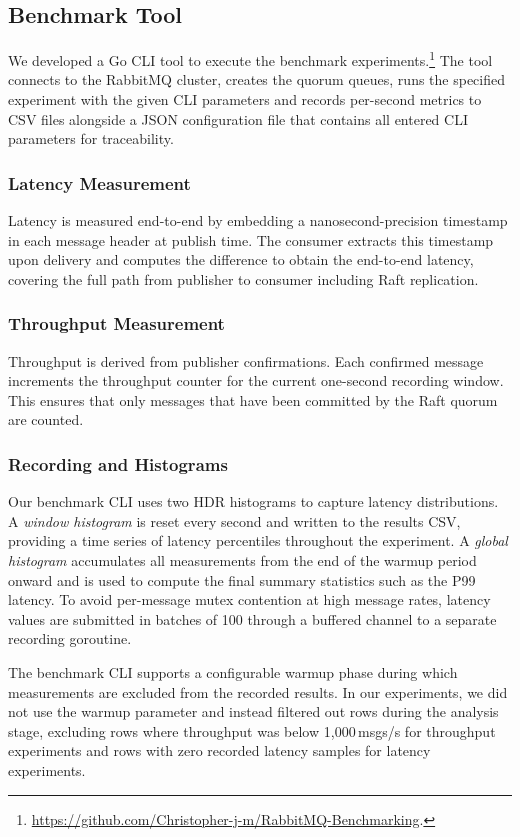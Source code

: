 \subsection{Benchmark Tool}
We developed a Go CLI tool to execute the benchmark experiments.\footnote{\url{https://github.com/Christopher-j-m/RabbitMQ-Benchmarking}.} The tool connects to the RabbitMQ cluster, creates the quorum queues, runs the specified experiment with the given CLI parameters and records per-second metrics to CSV files alongside a JSON configuration file that contains all entered CLI parameters for traceability.

\subsubsection{Latency Measurement}
Latency is measured end-to-end by embedding a nanosecond-precision timestamp in each message header at publish time. The consumer extracts this timestamp upon delivery and computes the difference to obtain the end-to-end latency, covering the full path from publisher to consumer including Raft replication.

\subsubsection{Throughput Measurement}
Throughput is derived from publisher confirmations. Each confirmed message increments the throughput counter for the current one-second recording window. This ensures that only messages that have been committed by the Raft quorum are counted.

\subsubsection{Recording and Histograms}
Our benchmark CLI uses two HDR histograms to capture latency distributions. A \textit{window histogram} is reset every second and written to the results CSV, providing a time series of latency percentiles throughout the experiment. A \textit{global histogram} accumulates all measurements from the end of the warmup period onward and is used to compute the final summary statistics such as the P99 latency. To avoid per-message mutex contention at high message rates, latency values are submitted in batches of 100 through a buffered channel to a separate recording goroutine.

The benchmark CLI supports a configurable warmup phase during which measurements are excluded from the recorded results. In our experiments, we did not use the warmup parameter and instead filtered out rows during the analysis stage, excluding rows where throughput was below 1{,}000\,msgs/s for throughput experiments and rows with zero recorded latency samples for latency experiments.

